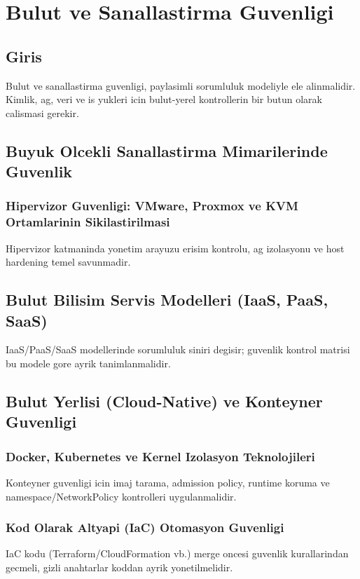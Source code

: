 ﻿\chapter{Bulut ve Sanallastirma Guvenligi}

\section*{Giris}
Bulut ve sanallastirma guvenligi, paylasimli sorumluluk modeliyle ele alinmalidir. Kimlik, ag, veri ve is yukleri icin bulut-yerel kontrollerin bir butun olarak calismasi gerekir.

\section{Buyuk Olcekli Sanallastirma Mimarilerinde Guvenlik}
\subsection{Hipervizor Guvenligi: VMware, Proxmox ve KVM Ortamlarinin Sikilastirilmasi}
Hipervizor katmaninda yonetim arayuzu erisim kontrolu, ag izolasyonu ve host hardening temel savunmadir.

\section{Bulut Bilisim Servis Modelleri (IaaS, PaaS, SaaS)}
IaaS/PaaS/SaaS modellerinde sorumluluk siniri degisir; guvenlik kontrol matrisi bu modele gore ayrik tanimlanmalidir.

\section{Bulut Yerlisi (Cloud-Native) ve Konteyner Guvenligi}
\subsection{Docker, Kubernetes ve Kernel Izolasyon Teknolojileri}
Konteyner guvenligi icin imaj tarama, admission policy, runtime koruma ve namespace/NetworkPolicy kontrolleri uygulanmalidir.

\subsection{Kod Olarak Altyapi (IaC) Otomasyon Guvenligi}
IaC kodu (Terraform/CloudFormation vb.) merge oncesi guvenlik kurallarindan gecmeli, gizli anahtarlar koddan ayrik yonetilmelidir.
